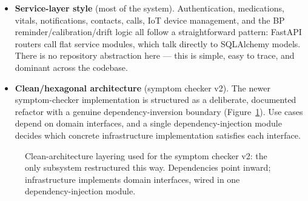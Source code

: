 \documentclass[12pt,a4paper]{report}
\begin{document}
\begin{itemize}[leftmargin=1.4em]
  \item \textbf{Service-layer style} (most of the system). Authentication,
  medications, vitals, notifications, contacts, calls, IoT device management,
  and the BP reminder/calibration/drift logic all follow a straightforward
  pattern: FastAPI routers call flat service modules, which talk directly to
  SQLAlchemy models. There is no repository abstraction here --- this is simple,
  easy to trace, and dominant across the codebase.
  \item \textbf{Clean/hexagonal architecture} (symptom checker v2). The newer
  symptom-checker implementation is structured as a deliberate, documented
  refactor with a genuine dependency-inversion boundary
  (Figure~\ref{fig:cleanarch}). Use cases depend on domain interfaces, and a
  single dependency-injection module decides which concrete infrastructure
  implementation satisfies each interface.
\end{itemize}

\begin{figure}[H]
\centering
{}%
\caption{Clean-architecture layering used for the symptom checker v2: the only
subsystem restructured this way. Dependencies point inward; infrastructure
implements domain interfaces, wired in one dependency-injection module.}
\label{fig:cleanarch}
\end{figure}
\end{document}
